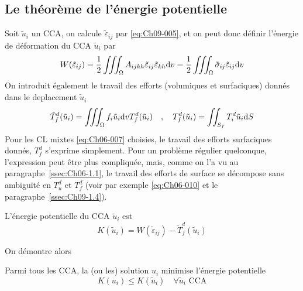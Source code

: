 \subsection{Le théorème de l'énergie potentielle} \label{ssec:Ch09-1.2}
Soit $\tilde{u}_i$ un CCA, on calcule $\tilde{\varepsilon}_{ij}$ par \eqref{eq:Ch09-005}, et on peut donc définir l'énergie de déformation du CCA $\tilde{u}_i$ par
\begin{equation}
    W(\tilde{\varepsilon}_{ij}) = \frac{1}{2} \iiint_{\Omega} A_{ijkh} \tilde{\varepsilon}_{ij} \tilde{\varepsilon}_{kh} \mathrm{d} v = \frac{1}{2} \iiint_{\Omega} \tilde{\sigma}_{ij} \tilde{\varepsilon}_{ij} \mathrm{d} v
    \label{eq:Ch09-013}
\end{equation}
On introduit également le travail des efforts (volumiques et surfaciques) donnés dans le deplacement $\tilde{u}_i$
\begin{equation}
    \tilde{T}_{f}^d (\tilde{u}_i) = \iiint_{\Omega} f_i \tilde{u}_i \mathrm{d} v T_f^d (\tilde{u}_i) \quad,\quad T_f^d(\tilde{u}_i) = \iint_{S_f} T_i^d \tilde{u}_i \mathrm{d} S
    \label{eq:Ch09-014}
\end{equation}
Pour les CL mixtes \eqref{eq:Ch06-007} choisies, le travail des efforts surfaciques donnés, $T_f^d$ s'exprime simplement.
Pour un problème régulier quelconque, l'expression peut être plus compliquée, mais, comme on l'a vu au paragraphe~\ref{ssec:Ch06-1.1}, le travail des efforts de surface se décompose sans ambiguïté en $T_u^d$ et $T_f^d$ (voir par exemple \eqref{eq:Ch06-010} et le paragraphe~\ref{ssec:Ch09-1.4}). 
\begin{deff}
    L'énergie potentielle du CCA $\tilde{u}_i$ est
    \begin{equation}
        K(\tilde{u}_i) = W(\tilde{\varepsilon}_{ij}) - \tilde{T}_f^d (\tilde{u}_i)
        \label{eq:Ch09-015}
    \end{equation}
\end{deff}
On 	démontre alors
\begin{thm}
    Parmi tous les CCA, la (ou les) solution $u_i$ minimise l'énergie potentielle
    \begin{equation}
        K(u_i) \leq K (\tilde{u}_i) \quad \forall \tilde{u}_i \text{ CCA}
        \label{eq:Ch09-016}
    \end{equation}
\end{thm}
